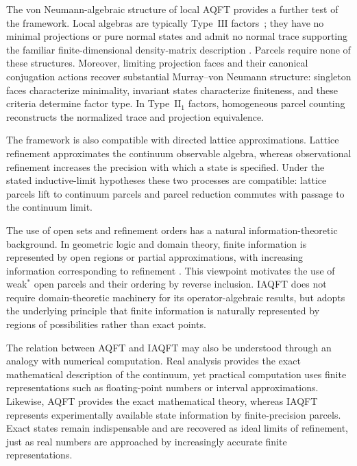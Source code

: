 \documentclass[11pt]{article}
\begin{document}
The von Neumann-algebraic structure of local AQFT provides a further
test of the framework. Local algebras are typically Type~$\mathrm{III}$
factors~\cite{Yngvason2005,FewsterRejzner2020}; they have no minimal
projections or pure normal states and admit no normal trace supporting
the familiar finite-dimensional density-matrix description
\cite{Yngvason2005,Witten2018}. Parcels require none of these structures.
Moreover, limiting projection faces and their canonical conjugation
actions recover substantial Murray--von Neumann structure: singleton
faces characterize minimality, invariant states characterize finiteness,
and these criteria determine factor type. In Type~$\mathrm{II}_1$
factors, homogeneous parcel counting reconstructs the normalized trace
and projection equivalence.

The framework is also compatible with directed lattice approximations.
Lattice refinement approximates the continuum observable algebra, whereas
observational refinement increases the precision with which a state is
specified. Under the stated inductive-limit hypotheses these two
processes are compatible: lattice parcels lift to continuum parcels and
parcel reduction commutes with passage to the continuum limit.

The use of open sets and refinement orders has a natural
information-theoretic background. In geometric logic and domain theory,
finite information is represented by open regions or partial
approximations, with increasing information corresponding to refinement
\cite{johnstone1982stone,vic89,abramsky1991domain,scott1970outline,
smyth1983,abramsky_domain_1994}. This viewpoint motivates the use of
weak$^*$ open parcels and their ordering by reverse inclusion. IAQFT does
not require domain-theoretic machinery for its operator-algebraic
results, but adopts the underlying principle that finite information is
naturally represented by regions of possibilities rather than exact
points.

The relation between AQFT and IAQFT may also be understood through an
analogy with numerical computation. Real analysis provides the exact
mathematical description of the continuum, yet practical computation
uses finite representations such as floating-point numbers or interval
approximations. Likewise, AQFT provides the exact mathematical theory,
whereas IAQFT represents experimentally available state information by
finite-precision parcels. Exact states remain indispensable and are
recovered as ideal limits of refinement, just as real numbers are
approached by increasingly accurate finite representations.
\end{document}
